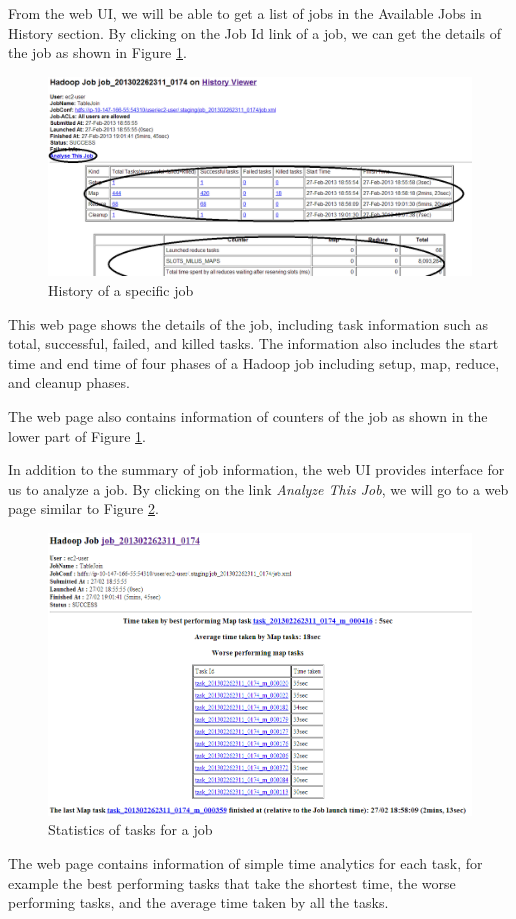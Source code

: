 From the web UI, we will be able to get a list of jobs in the Available Jobs in History section. By clicking on the Job Id link of a job, we can get the details of the job as shown in Figure \ref{fig:specific.job.history}.
\begin{figure}[ht]
  \centering
  \includegraphics[width=\textwidth]{figs/5163os_04_02.png}
  \caption{History of a specific job}\label{fig:specific.job.history}
\end{figure} 
This web page shows the details of the job, including task information such as total, successful, failed, and killed tasks. The information also includes the start time and end time of four phases of a Hadoop job including setup, map, reduce, and cleanup phases.

The web page also contains information of counters of the job as shown in the lower part of Figure \ref{fig:specific.job.history}.

In addition to the summary of job information, the web UI provides interface for us to analyze a job. By clicking on the link \emph{Analyze This Job}, we will go to a web page similar to Figure \ref{fig:task.statistics}.
\begin{figure}[ht]
  \centering
  \includegraphics[width=\textwidth]{figs/5163os_04_03.png}
  \caption{Statistics of tasks for a job}\label{fig:task.statistics}
\end{figure} 
The web page contains information of simple time analytics for each task, for example the best performing tasks that take the shortest time, the worse performing tasks, and the average time taken by all the tasks.

